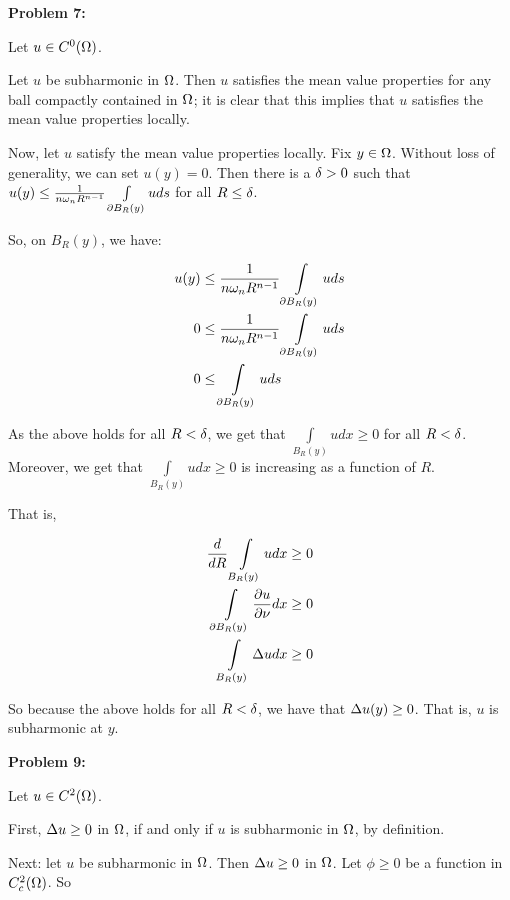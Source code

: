 \documentclass[a4paper,12pt]{article}
\begin{document}
{\bf Problem 7:}

Let $u \in C^0(\Omega)$.

Let $u$ be subharmonic in $\Omega$. Then $u$ satisfies the mean value properties for any ball compactly contained in $\Omega$; it is clear that this implies that $u$ satisfies the mean value properties locally.

Now, let $u$ satisfy the mean value properties locally. Fix $y \in \Omega$. Without loss of generality, we can set $u(y) = 0$. Then there is a $\delta >0$ such that $u(y) \leq \frac{1}{n\omega_nR^{n-1}} \int\limits_{\partial B_{R}(y)} u ds$ for all $R \leq \delta$. 

So, on $B_R(y)$, we have:

\begin{align*}
u(y) &\leq \frac{1}{n\omega_nR^{n-1}} \int\limits_{\partial B_{R}(y)} u ds\\
0 &\leq \frac{1}{n\omega_nR^{n-1}} \int\limits_{\partial B_{R}(y)} u ds\\
0 &\leq \int\limits_{\partial B_{R}(y)} u ds\\
\end{align*} %

As the above holds for all $R < \delta$, we get that $\int\limits_{B_R(y)} u dx \geq 0$ for all $R < \delta$. Moreover, we get that $\int\limits_{B_R(y)} u dx \geq 0$ is increasing as a function of $R$.

That is,

\begin{align*}
\frac{d}{dR} \int\limits_{B_R(y)} u dx &\geq 0\\
\int\limits_{\partial B_R(y)} \frac{\partial u}{\partial \nu} dx &\geq 0\\
\int\limits_{B_R(y)} \Delta u dx &\geq 0\\
\end{align*} %

So because the above holds for all $R < \delta$, we have that $\Delta u(y) \geq 0$. That is, $u$ is subharmonic at $y$. 

\shunt

{\bf Problem 9:}

Let $u \in C^2(\Omega)$.

First, $\Delta u \geq 0$ in $\Omega$, if and only if $u$ is subharmonic in $\Omega$, by definition. 

Next: let $u$ be subharmonic in $\Omega$. Then $\Delta u \geq 0$ in $\Omega$. Let $\phi \geq 0$ be a function in $C^2_c(\Omega)$. So 
\end{document}
